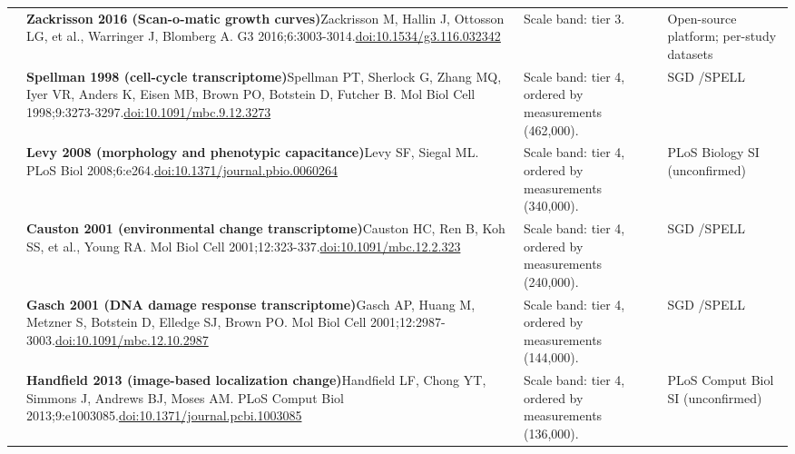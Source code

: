 \begin{landscape}
\begin{longtable}{@{}r@{\hspace{4pt}} L{86mm} L{92mm} L{62mm}@{}}
 & \textbf{Zackrisson 2016 (Scan-o-matic growth curves)}\newline Zackrisson M, Hallin J, Ottosson LG, et al., Warringer J, Blomberg A. G3 2016;6:3003-3014.\newline \href{https://doi.org/10.1534/g3.116.032342}{doi:10.1534/\allowbreak g3.116.032342} & Scale band: tier 3. & Open-source platform; per-study datasets \\
 & \textbf{Spellman 1998 (cell-cycle transcriptome)}\newline Spellman PT, Sherlock G, Zhang MQ, Iyer VR, Anders K, Eisen MB, Brown PO, Botstein D, Futcher B. Mol Biol Cell 1998;9:3273-3297.\newline \href{https://doi.org/10.1091/mbc.9.12.3273}{doi:10.1091/\allowbreak mbc.9.12.3273} & Scale band: tier 4, ordered by measurements (462,000). & SGD /\allowbreak  SPELL \\
 & \textbf{Levy 2008 (morphology and phenotypic capacitance)}\newline Levy SF, Siegal ML. PLoS Biol 2008;6:e264.\newline \href{https://doi.org/10.1371/journal.pbio.0060264}{doi:10.1371/\allowbreak journal.pbio.0060264} & Scale band: tier 4, ordered by measurements (340,000). & PLoS Biology SI (unconfirmed) \\
 & \textbf{Causton 2001 (environmental change transcriptome)}\newline Causton HC, Ren B, Koh SS, et al., Young RA. Mol Biol Cell 2001;12:323-337.\newline \href{https://doi.org/10.1091/mbc.12.2.323}{doi:10.1091/\allowbreak mbc.12.2.323} & Scale band: tier 4, ordered by measurements (240,000). & SGD /\allowbreak  SPELL \\
 & \textbf{Gasch 2001 (DNA damage response transcriptome)}\newline Gasch AP, Huang M, Metzner S, Botstein D, Elledge SJ, Brown PO. Mol Biol Cell 2001;12:2987-3003.\newline \href{https://doi.org/10.1091/mbc.12.10.2987}{doi:10.1091/\allowbreak mbc.12.10.2987} & Scale band: tier 4, ordered by measurements (144,000). & SGD /\allowbreak  SPELL \\
 & \textbf{Handfield 2013 (image-based localization change)}\newline Handfield LF, Chong YT, Simmons J, Andrews BJ, Moses AM. PLoS Comput Biol 2013;9:e1003085.\newline \href{https://doi.org/10.1371/journal.pcbi.1003085}{doi:10.1371/\allowbreak journal.pcbi.1003085} & Scale band: tier 4, ordered by measurements (136,000). & PLoS Comput Biol SI (unconfirmed) \\

\end{longtable}
\end{landscape}
